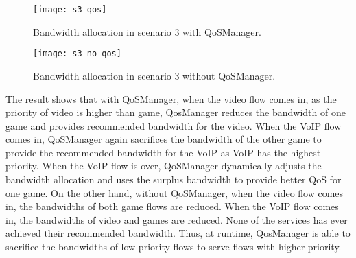 \begin{figure}[htb]
\centering
\texttt{[image: s3\_qos]}
\caption{Bandwidth allocation in scenario 3 with QoSManager.}
\label{fig:s3_qos}
\end{figure}

\begin{figure}[htb]
\centering
\texttt{[image: s3\_no\_qos]}
\caption{Bandwidth allocation in scenario 3 without QoSManager.}
\label{fig:s3_no_qos}
\end{figure}

The result shows that with QoSManager, when the video flow comes in, as the priority of video is higher than game, QosManager reduces the bandwidth of one game and provides recommended bandwidth
for the video. When the VoIP flow comes in, QoSManager again sacrifices the bandwidth of the other game to provide the recommended bandwidth for the VoIP as VoIP has the highest priority.
When the VoIP flow is over, QoSManager dynamically adjusts the bandwidth allocation and uses the surplus bandwidth to provide better QoS for one game. On the other hand, without QoSManager, when 
the video flow comes in, the bandwidths of both game flows are reduced. When the VoIP flow comes in, the bandwidths of video and games are reduced. None of the services has ever achieved their
recommended bandwidth. Thus, at runtime, QosManager is able to sacrifice the bandwidths of low priority flows to serve flows with higher priority.
